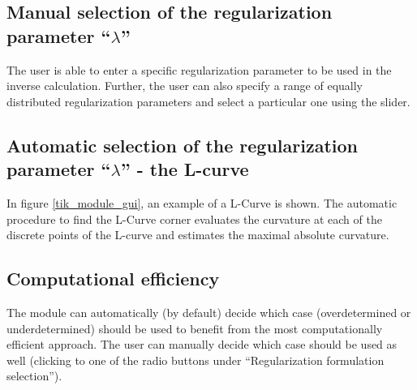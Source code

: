 \subsection*{Manual selection of the regularization parameter ``$\lambda$''}

The user is able to enter a specific regularization parameter to be used in
the inverse calculation. Further, the user can also specify a
range of equally distributed regularization parameters and select a particular one using the slider.

\subsection*{Automatic selection of the regularization parameter ``$\lambda$'' - the L-curve}

In figure \ref{tik_module_gui}, an example of a L-Curve is shown.
The automatic procedure to find the L-Curve corner evaluates the
curvature at each of the discrete points of the L-curve and estimates the maximal absolute curvature.


\subsection*{Computational efficiency}

The module can automatically (by default) decide which case (overdetermined or
underdetermined) should be used to benefit from the most computationally efficient
approach. The user can manually decide which case should be used as
well (clicking to one of the radio buttons under ``Regularization formulation selection'').\\


